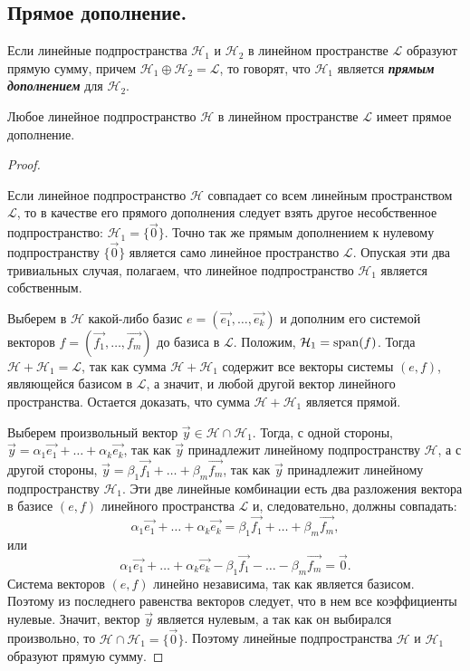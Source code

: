 \subsection{
    Прямое дополнение.
}

\begin{definition}
    Если линейные подпространства $\mathcal{H}_1$ и $\mathcal{H}_2$ в линейном пространстве $\mathcal{L}$ образуют прямую сумму, причем $\mathcal{H}_1 \oplus \mathcal{H}_2 = \mathcal{L}$, то говорят, что $\mathcal{H}_1$ является \textit{\textbf{прямым дополнением}} для $\mathcal{H}_2$.
\end{definition}

\begin{theorem}
    Любое линейное подпространство $\mathcal{H}$ в линейном пространстве $\mathcal{L}$ имеет прямое дополнение.
\end{theorem}

\begin{proof}~

    Если линейное подпространство $\mathcal{H}$  совпадает со всем линейным пространством $\mathcal{L}$, то в качестве его прямого дополнения следует взять другое несобственное подпространство: $\mathcal{H}_1 = \{\vec{0}\}$. Точно так же прямым дополнением к нулевому подпространству $\{\vec{0}\}$ является само линейное пространство $\mathcal{L}$. Опуская эти два тривиальных случая, полагаем, что линейное подпространство $\mathcal{H}_1$ является собственным.

    Выберем в $\mathcal{H}$ какой-либо базис $e = (\vec{e_1}, \ldots, \vec{e_k})$ и дополним его системой векторов $f = (\vec{f_1}, \ldots, \vec{f_m})$ до базиса в $\mathcal{L}$. Положим, $\mathcal{H}_1 = \operatorname{\mathop{\mathrm{span}}}(f)$. Тогда $\mathcal{H} + \mathcal{H}_1 = \mathcal{L}$, так как сумма $\mathcal{H} + \mathcal{H}_1$ содержит все векторы системы $(e, f)$, являющейся базисом в $\mathcal{L}$, а значит, и любой другой вектор линейного пространства. Остается доказать, что сумма $\mathcal{H} + \mathcal{H}_1$ является прямой.

    Выберем произвольный вектор $\vec{y} \in \mathcal{H} \cap \mathcal{H}_1$. Тогда, с одной стороны, $\vec{y} = \alpha_1\vec{e_1} + \ldots + \alpha_k\vec{e_k}$, так как $\vec{y}$ принадлежит линейному подпространству $\mathcal{H}$, а с другой стороны, $\vec{y} = \beta_1\vec{f_1} + \ldots + \beta_m\vec{f_m}$, так как $\vec{y}$ принадлежит линейному подпространству $\mathcal{H}_1$. Эти две линейные комбинации есть два разложения вектора в базисе $(e, f)$ линейного пространства $\mathcal{L}$ и, следовательно, должны совпадать:
    $$\alpha_1\vec{e_1} + \ldots + \alpha_k\vec{e_k} = \beta_1\vec{f_1} + \ldots + \beta_m\vec{f_m},$$
    или
    $$\alpha_1\vec{e_1} + \ldots + \alpha_k\vec{e_k} - \beta_1\vec{f_1} - \ldots - \beta_m\vec{f_m} = \vec{0}.$$
    Система векторов $(e, f)$ линейно независима, так как является базисом. Поэтому из последнего равенства векторов следует, что в нем все коэффициенты нулевые. Значит, вектор $\vec{y}$ является нулевым, а так как он выбирался произвольно, то $\mathcal{H} \cap \mathcal{H}_1 = \{\vec{0}\}$. Поэтому линейные подпространства $\mathcal{H}$ и $\mathcal{H}_1$ образуют прямую сумму.
\end{proof}
